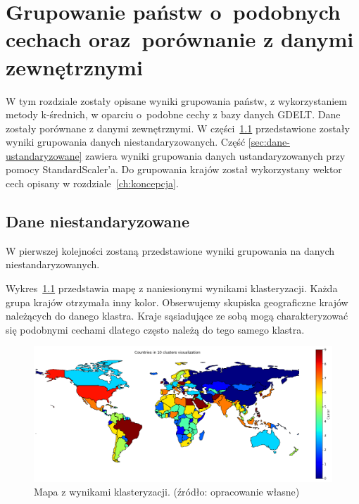 \documentclass[11pt]{report}
\begin{document}
    \chapter[Grupowanie państw]{Grupowanie państw o~podobnych cechach oraz~porównanie z danymi zewnętrznymi}\label{ch:grupowanie-państw-opodobnych-cechach-orazporównanie-z-danymi-zewnętrznymi}

    W tym rozdziale zostały opisane wyniki grupowania państw, z wykorzystaniem metody k-średnich, w oparciu o~podobne cechy z bazy danych GDELT.
    Dane zostały porównane z danymi zewnętrznymi.
    W części~\ref{sec:dane-niestandaryzowane} przedstawione zostały wyniki grupowania danych niestandaryzowanych.
    Część \ref{sec:dane-ustandaryzowane} zawiera wyniki grupowania danych ustandaryzowanych przy pomocy StandardScaler'a.
    Do grupowania krajów został wykorzystany wektor cech opisany w rozdziale~\ref{ch:koncepcja}.


    \section{Dane niestandaryzowane}\label{sec:dane-niestandaryzowane}
    W pierwszej kolejności zostaną przedstawione wyniki grupowania na danych niestandaryzowanych.

    Wykres~\ref{fig:clust10} przedstawia mapę z naniesionymi wynikami klasteryzacji.
    Każda grupa krajów otrzymała inny kolor.
    Obserwujemy skupiska geograficzne krajów należących do danego klastra.
    Kraje sąsiadujące ze sobą mogą charakteryzować się podobnymi cechami dlatego często należą do tego samego klastra.

    \begin{figure}[!htp]
        \centering
        \includegraphics[width=\linewidth]{fig/CLUST/10clusterMap.png}
        \caption{Mapa z wynikami klasteryzacji. (źródło: opracowanie własne)}
        \label{fig:clust10}
    \end{figure}
\end{document}
